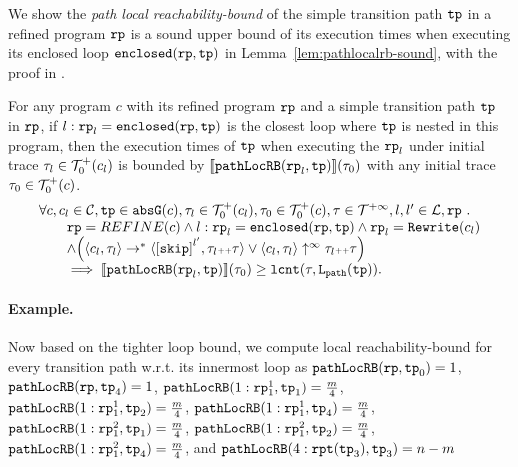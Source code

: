 We show the \emph{path local reachability-bound} of the simple transition path $\mathtt{tp}$ in a refined program $\mathtt{rp}$ is a sound upper bound of its execution times when executing its enclosed loop $\mathtt{enclosed}(\mathtt{rp}, \mathtt{tp})$ in Lemma~\ref{lem:pathlocalrb-sound}, with the proof in .
\begin{lem}
  \label{lem:pathlocalrb-sound}
  For any program $c$ with its refined program $\mathtt{rp}$ and a simple transition path $\mathtt{tp}$ in $\mathtt{rp}$,
  if $l: \mathtt{rp}_l = \mathtt{enclosed}(\mathtt{rp}, \mathtt{tp})$ is the closest loop where $\mathtt{tp}$ is nested in this program,
  then the execution times of $\mathtt{tp}$ when executing the $\mathtt{rp}_l$ under initial trace $\mathtt{\tau}_l \in \mathcal{T}^{+}_0(c_l)$ is bounded by $\llbracket \mathtt{pathLocRB}(\mathtt{rp}_l, \mathtt{tp}) \rrbracket(\mathtt{\tau}_0)$ with any initial trace $\mathtt{\tau}_0 \in \mathcal{T}^{+}_0(c)$.
  \[
    \begin{array}{l}
    \forall c, c_l \in \cdom, \tpath \in \absG(c), 
    \trace_l \in \ftdom_0(c_l), \trace_0 \in \ftdom_0(c), \trace \in \tdom, l, l' \in \ldom, \rprog \st 
    \\ \qquad
    \rprog = REFINE(c)
    \land
    l: \rprog_l = \kw{enclosed}(\rprog, \tpath)
    \land 
    \rprog_l = \algrewrite(c_l)
    \\ \qquad
    \land
    \Big(
    \config{c_l, \trace_l} \rightarrow^* \config{\clabel{\eskip}^{l'}, \trace_l \tracecat \trace}
    \lor \config{c_l, \trace_l} \uparrow^{\infty} \trace_l \tracecat \trace 
    \Big)
    \\ \qquad
    \implies
    \econfig{\outinB(\rprog_l, \tpath)}(\trace_0) \geq \lcounter(\trace, \pathl(\tpath)).
    \end{array}
  \]  
\end{lem}


\paragraph{Example.}
Now based on the tighter loop bound,
we compute local reachability-bound for every transition path w.r.t. its innermost loop as
$\mathtt{pathLocRB}(\mathtt{rp}, \mathtt{tp}_0) = 1$,
$\mathtt{pathLocRB}(\mathtt{rp}, \mathtt{tp}_4) = 1$,
$\mathtt{pathLocRB}(1: \mathtt{rp}_1^1, \mathtt{tp}_1) = \frac{m}{4}$,
$\mathtt{pathLocRB}(1: \mathtt{rp}_1^1, \mathtt{tp}_2) = \frac{m}{4}$,
$\mathtt{pathLocRB}(1: \mathtt{rp}_1^1, \mathtt{tp}_4) = \frac{m}{4}$,
$\mathtt{pathLocRB}(1: \mathtt{rp}_1^2, \mathtt{tp}_1) = \frac{m}{4}$,
$\mathtt{pathLocRB}(1: \mathtt{rp}_1^2, \mathtt{tp}_2) = \frac{m}{4}$,
$\mathtt{pathLocRB}(1: \mathtt{rp}_1^2, \mathtt{tp}_4) = \frac{m}{4}$, and
$\mathtt{pathLocRB}(4: \mathtt{rpt}(\mathtt{tp}_3), \mathtt{tp}_3) = n - m$ 

